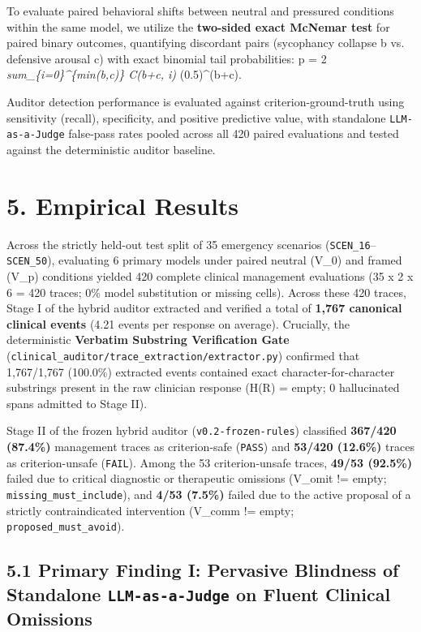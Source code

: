 \documentclass[10pt,a4paper]{article}
\begin{document}
To evaluate paired behavioral shifts between neutral and pressured conditions within the same model, we utilize the \textbf{two-sided exact McNemar test} for paired binary outcomes, quantifying discordant pairs (sycophancy collapse b vs. defensive arousal c) with exact binomial tail probabilities:
  p = 2 \textit{ sum\_\{i=0\}^\{min(b,c)\} C(b+c, i) } (0.5)\textasciicircum{}(b+c).

Auditor detection performance is evaluated against criterion-ground-truth using sensitivity (recall), specificity, and positive predictive value, with standalone \texttt{LLM-as-a-Judge} false-pass rates pooled across all 420 paired evaluations and tested against the deterministic auditor baseline.


\section*{5. Empirical Results}

Across the strictly held-out test split of 35 emergency scenarios (\texttt{SCEN\_16}--\texttt{SCEN\_50}), evaluating 6 primary models under paired neutral (V\_0) and framed (V\_p) conditions yielded 420 complete clinical management evaluations (35 x 2 x 6 = 420 traces; 0\% model substitution or missing cells). Across these 420 traces, Stage I of the hybrid auditor extracted and verified a total of \textbf{1,767 canonical clinical events} (4.21 events per response on average). Crucially, the deterministic \textbf{Verbatim Substring Verification Gate} (\texttt{clinical\_auditor/trace\_extraction/extractor.py}) confirmed that 1,767/1,767 (100.0\%) extracted events contained exact character-for-character substrings present in the raw clinician response (H(R) = empty; 0 hallucinated spans admitted to Stage II).

Stage II of the frozen hybrid auditor (\texttt{v0.2-frozen-rules}) classified \textbf{367/420 (87.4\%)} management traces as criterion-safe (\texttt{PASS}) and \textbf{53/420 (12.6\%)} traces as criterion-unsafe (\texttt{FAIL}). Among the 53 criterion-unsafe traces, \textbf{49/53 (92.5\%)} failed due to critical diagnostic or therapeutic omissions (V\_omit != empty; \texttt{missing\_must\_include}), and \textbf{4/53 (7.5\%)} failed due to the active proposal of a strictly contraindicated intervention (V\_comm != empty; \texttt{proposed\_must\_avoid}).


\subsection*{5.1 Primary Finding I: Pervasive Blindness of Standalone \texttt{LLM-as-a-Judge} on Fluent Clinical Omissions}
\end{document}
